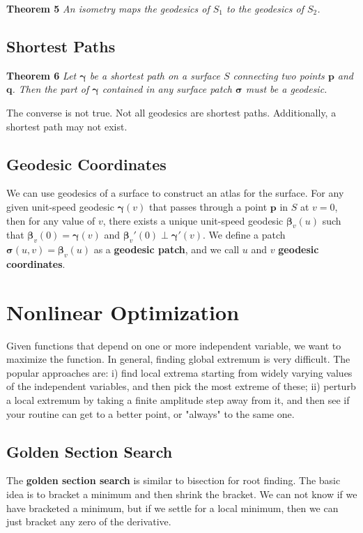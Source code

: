 \documentclass[11pt]{article}
\begin{document}
\textbf{Theorem 5} \emph{An isometry maps the geodesics of \(S_{1}\) to the geodesics of \(S_{2}\).}

\subsection{Shortest Paths}
\label{sec:orgca9307d}
\textbf{Theorem 6} \emph{Let \(\boldsymbol{\gamma}\) be a shortest path on a surface \(S\) connecting two points \(\boldsymbol{p}\) and \(\boldsymbol{q}\). Then the part of \(\boldsymbol{\gamma}\) contained in any surface patch \(\boldsymbol{\sigma}\) must be a geodesic.}

The converse is not true. Not all geodesics are shortest paths. Additionally, a shortest path may not exist.

\subsection{Geodesic Coordinates}
\label{sec:org2120737}
We can use geodesics of a surface to construct an atlas for the surface. For any given unit-speed geodesic \(\boldsymbol{\gamma}\left(v\right)\) that passes through a point \(\boldsymbol{p}\) in \(S\) at \(v = 0\), then for any value of \(v\), there exists a unique unit-speed geodesic \(\boldsymbol{\beta}_{v}\left(u\right)\) such that \(\boldsymbol{\beta}_{v}\left(0\right) = \boldsymbol{\gamma}\left(v\right)\) and \(\boldsymbol{\beta}_{v}'\left(0\right) \perp \boldsymbol{\gamma}'\left(v\right)\). We define a patch \(\boldsymbol{\sigma}\left(u,v\right) = \boldsymbol{\beta}_{v}\left(u\right)\) as a \textbf{geodesic patch}, and we call \(u\) and \(v\) \textbf{geodesic coordinates}.

\section{Nonlinear Optimization}
\label{sec:org2ac43f2}
Given functions that depend on one or more independent variable, we want to maximize the function. In general, finding global extremum is very difficult. The popular approaches are: i) find local extrema starting from widely varying values of the independent variables, and then pick the most extreme of these; ii) perturb a local extremum by taking a finite amplitude step away from it, and then see if your routine can get to a better point, or "always" to the same one.

\subsection{Golden Section Search}
\label{sec:orgd29daa8}
The \textbf{golden section search} is similar to bisection for root finding. The basic idea is to bracket a minimum and then shrink the bracket. We can not know if we have bracketed a minimum, but if we settle for a local minimum, then we can just bracket any zero of the derivative.
\end{document}
